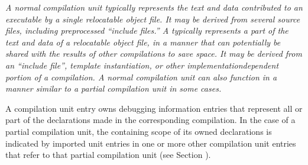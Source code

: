\textit{A normal compilation unit typically represents the text and
data contributed to an executable by a single relocatable
object file. It may be derived from several source files,
including pre\dash processed ``include files.'' 
A  typically represents a part of the text
and data of a relocatable object file, in a manner that can
potentially be shared with the results of other compilations
to save space. It may be derived from an ``include file'',
template instantiation, or other implementation\dash dependent
portion of a compilation. A normal compilation unit can also
function in a manner similar to a partial compilation unit
in some cases.}

A compilation unit entry owns debugging information
entries that represent all or part of the declarations
made in the corresponding compilation. In the case of a
partial compilation unit, the containing scope of its owned
declarations is indicated by imported unit entries in one
or more other compilation unit entries that refer to that
partial compilation unit (see 
Section ).


